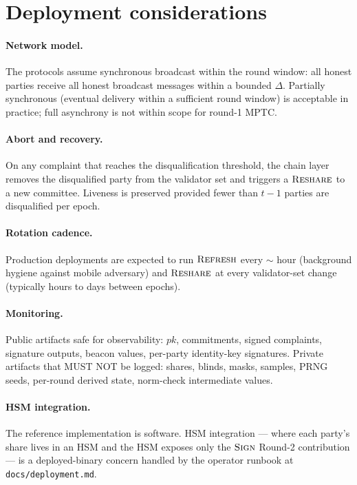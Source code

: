 \documentclass[11pt,a4paper]{article}
\theoremstyle{definition}
\theoremstyle{remark}
\newcommand{\Sign}{\textsc{Sign}}
\newcommand{\Reshare}{\textsc{Reshare}}
\newcommand{\Refresh}{\textsc{Refresh}}
\begin{document}
\section{Deployment considerations}
\label{sec:deployment}

\paragraph{Network model.}
The protocols assume synchronous broadcast within the round window:
all honest parties receive all honest broadcast messages within a
bounded $\Delta$. Partially synchronous (eventual delivery within a
sufficient round window) is acceptable in practice; full
asynchrony is not within scope for round-1 MPTC.

\paragraph{Abort and recovery.}
On any complaint that reaches the disqualification threshold, the
chain layer removes the disqualified party from the validator set
and triggers a $\Reshare$ to a new committee. Liveness is preserved
provided fewer than $t-1$ parties are disqualified per epoch.

\paragraph{Rotation cadence.}
Production deployments are expected to run $\Refresh$ every
$\sim$ hour (background hygiene against mobile adversary) and
$\Reshare$ at every validator-set change (typically hours to days
between epochs).

\paragraph{Monitoring.}
Public artifacts safe for observability: $\mathit{pk}$, commitments,
signed complaints, signature outputs, beacon values, per-party
identity-key signatures. Private artifacts that MUST NOT be logged:
shares, blinds, masks, samples, PRNG seeds, per-round derived state,
norm-check intermediate values.

\paragraph{HSM integration.}
The reference implementation is software. HSM integration --- where
each party's share lives in an HSM and the HSM exposes only the
$\Sign$ Round-2 contribution --- is a deployed-binary concern handled
by the operator runbook at \texttt{docs/deployment.md}.
\end{document}
